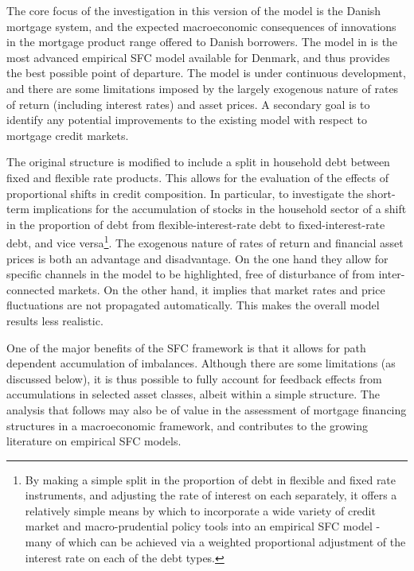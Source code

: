 \documentclass[
]{book}
\begin{document}
The core focus of the investigation in this version of the model is the Danish mortgage system, and the expected macroeconomic consequences of innovations in the mortgage product range offered to Danish borrowers. The model in \citet{byrialsenraza2019empirical} is the most advanced empirical SFC model available for Denmark, and thus provides the best possible point of departure. The model is under continuous development, and there are some limitations imposed by the largely exogenous nature of rates of return (including interest rates) and asset prices. A secondary goal is to identify any potential improvements to the existing model with respect to mortgage credit markets.

The original structure is modified to include a split in household debt between fixed and flexible rate products. This allows for the evaluation of the effects of proportional shifts in credit composition. In particular, to investigate the short-term implications for the accumulation of stocks in the household sector of a shift in the proportion of debt from flexible-interest-rate debt to fixed-interest-rate debt, and vice versa\footnote{By making a simple split in the proportion of debt in flexible and fixed rate instruments, and adjusting the rate of interest on each separately, it offers a relatively simple means by which to incorporate a wide variety of credit market and macro-prudential policy tools into an empirical SFC model - many of which can be achieved via a weighted proportional adjustment of the interest rate on each of the debt types.}. The exogenous nature of rates of return and financial asset prices is both an advantage and disadvantage. On the one hand they allow for specific channels in the model to be highlighted, free of disturbance of from inter-connected markets. On the other hand, it implies that market rates and price fluctuations are not propagated automatically. This makes the overall model results less realistic.

One of the major benefits of the SFC framework is that it allows for path dependent accumulation of imbalances. Although there are some limitations (as discussed below), it is thus possible to fully account for feedback effects from accumulations in selected asset classes, albeit within a simple structure. The analysis that follows may also be of value in the assessment of mortgage financing structures in a macroeconomic framework, and contributes to the growing literature on empirical SFC models.
\end{document}
